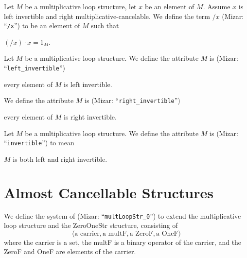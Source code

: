 \documentclass{article}
\begin{document}
\begin{definition}
Let $M$ be a multiplicative loop structure, let $x$ be an element of $M$.
Assume $x$ is left invertible and right multiplicative-cancelable.
We define the term $/x$ (Mizar: ``\verb#/x#'')
to be an element of $M$ such that
\begin{defn}%
\item $(/x)\cdot x=1_{M}$.
\end{defn}
\end{definition}

\begin{definition}
Let $M$ be a multiplicative loop structure.
We define the attribute $M$ is 
(Mizar: ``\verb#left_invertible#'')
\begin{defn}%
\item every element of $M$ is left invertible.
\end{defn}
We define the attribute $M$ is 
(Mizar: ``\verb#right_invertible#'')
\begin{defn}%
\item every element of $M$ is right invertible.
\end{defn}
\end{definition}

\begin{definition}
Let $M$ be a multiplicative loop structure.
We define the attribute $M$ is 
(Mizar: ``\verb#invertible#'')
to mean
\begin{defn}
\item $M$ is both left and right invertible.
\end{defn}
\end{definition}

\section{Almost Cancellable Structures}

\begin{definition}
We define the system of 
(Mizar: ``\verb#multLoopStr_0#'') to extend the multiplicative loop
structure and the ZeroOneStr structure, consisting of
\[\langle \mbox{a carrier}, \mbox{a multF}, \mbox{a ZeroF}, \mbox{a OneF}\rangle\]
where the carrier is a set, the multF is a binary operator of the
carrier, and the ZeroF and OneF are elements of the carrier.
\end{definition}
\end{document}
